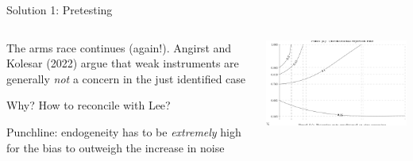 \documentclass[notes,11pt, aspectratio=169]{beamer}
\newenvironment{wideitemize}{\itemize\addtolength{\itemsep}{10pt}}{\enditemize}
\begin{document}
\begin{frame}{Solution 1: Pretesting}
  \begin{columns}[T] %
    \begin{column}{0.5\textwidth}
      \begin{wideitemize}
      \item The arms race continues (again!). Angirst and Kolesar
        (2022) argue that weak instruments are generally \emph{not} a
        concern in the just identified case
      \item Why? How to reconcile with Lee?
        \item Punchline: endogeneity has to be \emph{extremely} high for the bias to outweigh the increase in noise
      \end{wideitemize}
    \end{column}
    \begin{column}{0.5\textwidth}
      \includegraphics[width=\linewidth]{images/angristkolesar_contour.png}
    \end{column}
  \end{columns}
\end{frame}
\end{document}
